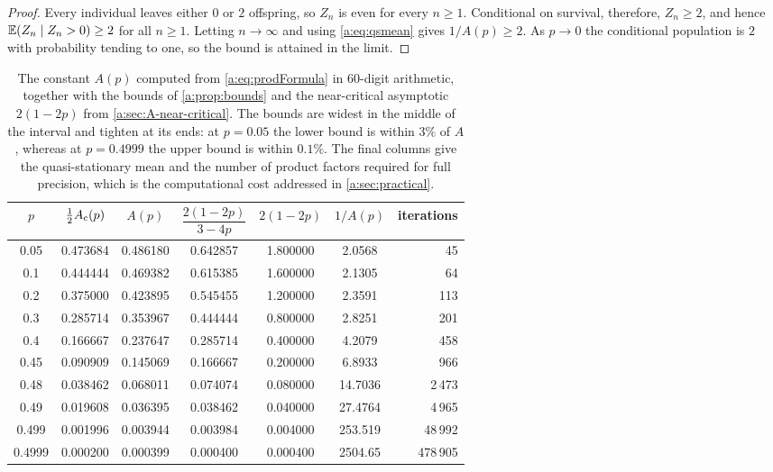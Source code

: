 \begin{proof}
Every individual leaves either $0$ or $2$ offspring, so $Z_n$ is even for every
$n\ge1$. Conditional on survival, therefore, $Z_n\ge2$, and hence
$\mathbb{E}\!\left(Z_n\mid Z_n>0\right)\ge2$ for all $n\ge1$. Letting $n\to\infty$ and using
\cref{a:eq:qsmean} gives $1/A(p)\ge2$. As $p\to0$ the conditional population is $2$
with probability tending to one, so the bound is attained in the limit.
\end{proof}

\begin{table}[ht]
\centering
\caption{The constant $A(p)$ computed from \cref{a:eq:prodFormula} in
$60$-digit arithmetic, together with the bounds of \cref{a:prop:bounds} and the
near-critical asymptotic $2(1-2p)$ from \cref{a:sec:A-near-critical}.  The bounds
are widest in the middle of the interval and tighten at its ends: at $p=0.05$ the
lower bound is within $3\%$ of $A$, whereas at $p=0.4999$ the upper bound is within
$0.1\%$.  The final columns give the quasi-stationary mean and the number of
product factors required for full precision, which is the computational cost
addressed in \cref{a:sec:practical}.}
\label{a:tab:Avals}
\begin{tabular}{ccccccr}
\toprule
$p$ & $\tfrac12A_{\mathrm{c}}(p)$ & $A(p)$ & $\dfrac{2(1-2p)}{3-4p}$ & $2(1-2p)$ & $1/A(p)$ & iterations\\
\midrule
0.05   & 0.473684 & 0.486180 & 0.642857 & 1.800000 & 2.0568 & 45 \\
0.1    & 0.444444 & 0.469382 & 0.615385 & 1.600000 & 2.1305 & 64 \\
0.2    & 0.375000 & 0.423895 & 0.545455 & 1.200000 & 2.3591 & 113 \\
0.3    & 0.285714 & 0.353967 & 0.444444 & 0.800000 & 2.8251 & 201 \\
0.4    & 0.166667 & 0.237647 & 0.285714 & 0.400000 & 4.2079 & 458 \\
0.45   & 0.090909 & 0.145069 & 0.166667 & 0.200000 & 6.8933 & 966 \\
0.48   & 0.038462 & 0.068011 & 0.074074 & 0.080000 & 14.7036 & 2\,473 \\
0.49   & 0.019608 & 0.036395 & 0.038462 & 0.040000 & 27.4764 & 4\,965 \\
0.499  & 0.001996 & 0.003944 & 0.003984 & 0.004000 & 253.519 & 48\,992 \\
0.4999 & 0.000200 & 0.000399 & 0.000400 & 0.000400 & 2504.65 & 478\,905 \\
\bottomrule
\end{tabular}
\end{table}
